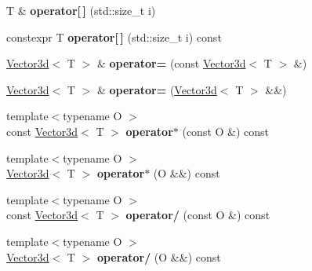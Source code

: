 \begin{DoxyCompactItemize}
\mbox{\label{classenhance_1_1Vector3d_a74225e32c5ce326ec8b8295979f65524}} 
T \& {\bfseries operator\mbox{[}$\,$\mbox{]}} (std\+::size\+\_\+t i)
\item 
\mbox{\label{classenhance_1_1Vector3d_a0605d2ec5d2258edb6f429a0f2ca3b3c}} 
constexpr T {\bfseries operator\mbox{[}$\,$\mbox{]}} (std\+::size\+\_\+t i) const
\item 
\mbox{\label{classenhance_1_1Vector3d_a902095f031fd29a5cc634f29a6c5002d}} 
\mbox{\hyperlink{classenhance_1_1Vector3d}{Vector3d}}$<$ T $>$ \& {\bfseries operator=} (const \mbox{\hyperlink{classenhance_1_1Vector3d}{Vector3d}}$<$ T $>$ \&)
\item 
\mbox{\label{classenhance_1_1Vector3d_ad45050c6e7a976fedf68b2188b91c08e}} 
\mbox{\hyperlink{classenhance_1_1Vector3d}{Vector3d}}$<$ T $>$ \& {\bfseries operator=} (\mbox{\hyperlink{classenhance_1_1Vector3d}{Vector3d}}$<$ T $>$ \&\&)
\item 
\mbox{\label{classenhance_1_1Vector3d_a8c713ef30317a14de572aef4cc2a9c32}} 
{\footnotesize template$<$typename O $>$ }\\const \mbox{\hyperlink{classenhance_1_1Vector3d}{Vector3d}}$<$ T $>$ {\bfseries operator$\ast$} (const O \&) const
\item 
\mbox{\label{classenhance_1_1Vector3d_a83bfd54db1359389c9d22efed2c3f50f}} 
{\footnotesize template$<$typename O $>$ }\\\mbox{\hyperlink{classenhance_1_1Vector3d}{Vector3d}}$<$ T $>$ {\bfseries operator$\ast$} (O \&\&) const
\item 
\mbox{\label{classenhance_1_1Vector3d_a911799196cd145ed67384623943659c8}} 
{\footnotesize template$<$typename O $>$ }\\const \mbox{\hyperlink{classenhance_1_1Vector3d}{Vector3d}}$<$ T $>$ {\bfseries operator/} (const O \&) const
\item 
\mbox{\label{classenhance_1_1Vector3d_add3791808ae6d592cd2ead3654fd5295}} 
{\footnotesize template$<$typename O $>$ }\\\mbox{\hyperlink{classenhance_1_1Vector3d}{Vector3d}}$<$ T $>$ {\bfseries operator/} (O \&\&) const

\end{DoxyCompactItemize}
